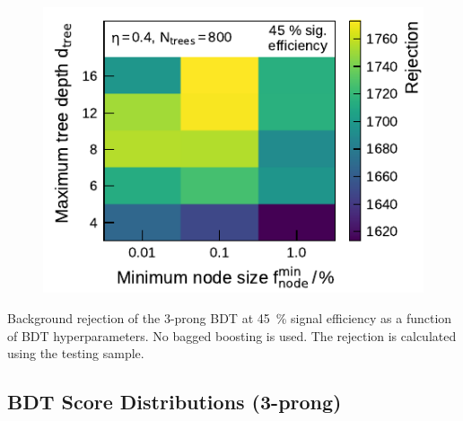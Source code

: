 \begin{minipage}{\textwidth}
\begin{subfigure}[t]{0.48\textwidth}
  \end{subfigure}\hfill
  \begin{subfigure}[t]{0.48\textwidth}
    \centering
    \includegraphics{./figures/bdt_perf/gridsearch_3p/scan_MinNodeSize_MaxDepth.pdf}
  \end{subfigure}
  \caption[Background rejection as a function of BDT hyperparameters
  (3-prong)]{Background rejection of the 3-prong BDT at \SI{45}{\percent} signal
    efficiency as a function of BDT hyperparameters. No bagged boosting is used.
    The rejection is calculated using the testing sample.}
  \label{fig:hyperparameter_scan_3p}
\end{minipage}

\FloatBarrier
\subsection{BDT Score Distributions (3-prong)}
\label{app:bdt_stuff}

